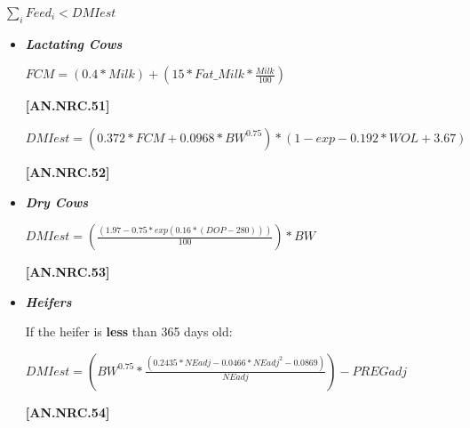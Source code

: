 \documentclass{article}
\begin{document}
\begin{refsection}
\begin{center}
    \(\sum_{i}Feed_{i} < DMIest\)
\end{center}

        \begin{itemize}
        \item \textbf{\textit{Lactating Cows}}
                \vspace{0.2cm}
                
\begin{center}
    \(FCM = (0.4 * Milk) + (15 * Fat\_Milk * \frac{Milk}{100})\)
\end{center}

\vspace{0.5cm}
            {\raggedleft \textbf{[AN.NRC.51]}\par}
\vspace{0.5cm}

\begin{center}
    \(DMIest = (0.372 * FCM + 0.0968 * BW^{0.75}) * (1 - exp - 0.192 * WOL + 3.67)\)
\end{center}

\vspace{0.5cm}
            {\raggedleft \textbf{[AN.NRC.52]}\par}
\vspace{0.5cm}

        \item \textbf{\textit{Dry Cows}}
\vspace{0.5cm}

\begin{center}
    \(DMIest = (\frac{(1.97 - 0.75 * exp(0.16 * (DOP - 280)))}{100}) * BW\)
\end{center}

\vspace{0.5cm}
            {\raggedleft \textbf{[AN.NRC.53]}\par}
\vspace{0.5cm}

        \item \textbf{\textit{Heifers}}
\vspace{0.5cm}

If the heifer is \textbf{less} than 365 days old:
\begin{center}
    \(DMIest = (BW^{0.75} * \frac{(0.2435 * NEadj - 0.0466 * NEadj^{2} - 0.0869)}{NEadj}) - PREGadj \)
\end{center}

\vspace{0.5cm}
            {\raggedleft \textbf{[AN.NRC.54]}\par}
\vspace{0.5cm}


\end{itemize}
\end{refsection}
\end{document}
